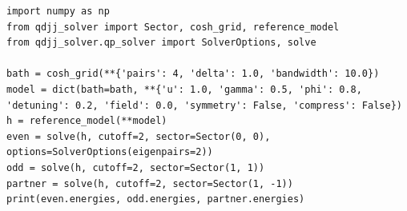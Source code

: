 \begin{lstlisting}
import numpy as np
from qdjj_solver import Sector, cosh_grid, reference_model
from qdjj_solver.qp_solver import SolverOptions, solve

bath = cosh_grid(**{'pairs': 4, 'delta': 1.0, 'bandwidth': 10.0})
model = dict(bath=bath, **{'u': 1.0, 'gamma': 0.5, 'phi': 0.8, 'detuning': 0.2, 'field': 0.0, 'symmetry': False, 'compress': False})
h = reference_model(**model)
even = solve(h, cutoff=2, sector=Sector(0, 0), options=SolverOptions(eigenpairs=2))
odd = solve(h, cutoff=2, sector=Sector(1, 1))
partner = solve(h, cutoff=2, sector=Sector(1, -1))
print(even.energies, odd.energies, partner.energies)
\end{lstlisting}
